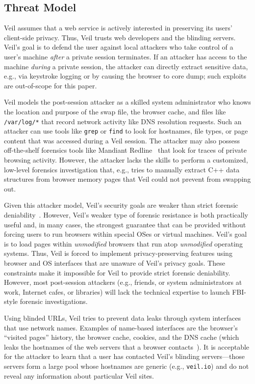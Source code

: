 \subsection{Threat Model}

Veil assumes that a web service is actively interested
in preserving its users' client-side privacy.
Thus, Veil trusts web developers and the blinding servers.
Veil's goal is to defend the user against local
attackers who take control of a user's machine
\textit{after} a private session terminates. If an
attacker has access to the machine \emph{during} a
private session, the attacker can directly extract
sensitive data, e.g., via keystroke logging or by
causing the browser to core dump; such exploits are
out-of-scope for this paper.

Veil models the post-session attacker as a skilled
system administrator who knows the location and purpose
of the swap file, the browser cache, and files like
\texttt{/var/log/*} that record network activity
like DNS resolution requests. Such an attacker can
use tools like \texttt{grep} or \texttt{find} to
look for hostnames, file types, or page content that
was accessed during a Veil session. The attacker
may also possess off-the-shelf forensics tools like
Mandiant Redline~\cite{mandiant} that look for traces
of private browsing activity. However, the attacker
lacks the skills to perform a customized, low-level
forensics investigation that, e.g., tries to manually
extract C++ data structures from browser memory
pages that Veil could not prevent from swapping out.

Given this attacker model, Veil's security goals are
weaker than strict forensic deniability~\cite{lacuna}.
However, Veil's weaker type of forensic resistance
is both practically useful and, in many cases, the
strongest guarantee that can be provided without
forcing users to run browsers within special OSes or
virtual machines. Veil's goal is to load pages within
\textit{unmodified} browsers that run atop
\textit{unmodified} operating systems. Thus, Veil
is forced to implement privacy-preserving features
using browser and OS interfaces that are unaware of
Veil's privacy goals. These constraints make it
impossible for Veil to provide strict forensic
deniability. However, most post-session attackers
(e.g., friends, or system administrators at work,
Internet cafes, or libraries) will
lack the technical expertise to launch FBI-style
forensic investigations.

Using blinded URLs, Veil tries to prevent data leaks
through system interfaces that use network names.
Examples of name-based interfaces are the browser's ``visited pages''
history, the browser cache, cookies, and the DNS
cache (which leaks the hostnames of the web servers
that a browser contacts~\cite{aggarwal10}). It is
acceptable for the attacker to learn that a user
has contacted Veil's blinding servers---those
servers form a large pool whose hostnames are generic
(e.g., \texttt{veil.io}) and do not reveal
any information about particular Veil sites.


